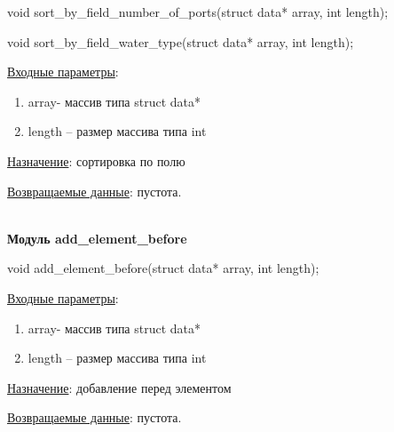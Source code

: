 void sort\_by\_field\_number\_of\_ports(struct data* array, int length);

void sort\_by\_field\_water\_type(struct data* array, int length);

\underline{Входные параметры}:

\begin{enumerate}
    \item array- массив типа struct data*
    \item length – размер массива типа int
\end{enumerate}

\underline{Назначение}: сортировка по полю 

\underline{Возвращаемые данные}: пустота.

\hspace{0pt}\\



\textbf{Модуль add\_element\_before}

void add\_element\_before(struct data* array, int length);

\underline{Входные параметры}:

\begin{enumerate}
    \item array- массив типа struct data*
    \item length – размер массива типа int
\end{enumerate}

\underline{Назначение}: добавление перед элементом

\underline{Возвращаемые данные}: пустота.
